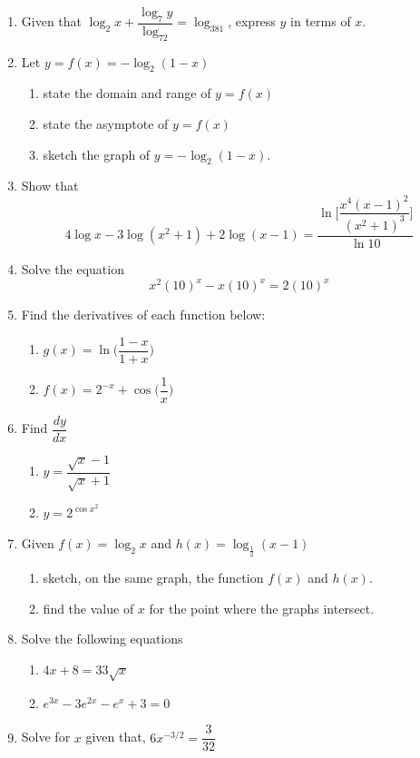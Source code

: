 \documentclass[11pt,a4paper]{article}
\begin{document}
\begin{enumerate}
\item Given that $\log_2x+\dfrac{\log_7y}{\log_72}=\log_381$, express $y$ in terms of $x$.

\item Let $y=f(x)=-\log_2(1-x)$
\begin{enumerate}
       \item state the domain and range of $y=f(x)$
       \item state the asymptote of $y=f(x)$
       \item sketch the graph of $y=-\log_2(1-x)$.
\end{enumerate}

\item Show that $$4\log x-3\log (x^2+1)+2\log (x-1) = \dfrac{\ln \bigg[\dfrac{x^4(x-1)^2}{(x^2+1)^3}\bigg]}{\ln 10}$$

\item Solve the equation $$x^2 (10)^x-x(10)^x=2(10)^x$$

\item Find the derivatives of each function below:
\begin{enumerate}
     \item $g(x)=\ln\bigg(\dfrac{1-x}{1+x}\bigg)$
     \item $f(x)=2^{\displaystyle{-x}}+\cos \bigg(\dfrac{1}{x}\bigg)$
\end{enumerate}

\item Find $\dfrac{dy}{dx}$
\begin{enumerate}
      \item $y=\dfrac{\sqrt{x}-1}{\sqrt{x}+1}$
      \item $y=2^{\displaystyle{\cos x^{\displaystyle{2}}}}$
\end{enumerate}

\item Given $f(x)=\log_{2}x$ and $h(x)=\log_{\frac{1}{2}}(x-1)$
\begin{enumerate}
     \item sketch, on the same graph, the function $f(x)$ and $h(x)$.
     \item find the value of $x$ for the point where the graphs intersect.       
\end{enumerate}

\item Solve the following equations
\begin{enumerate}
      \item $4x+8=33\sqrt{x}$
      \item $e^{3x}-3e^{2x}-e^x+3=0$
\end{enumerate}

\item Solve for $x$ given that, $6x^{-3/2}=\dfrac{3}{32}$\\
\end{enumerate}
\end{document}
